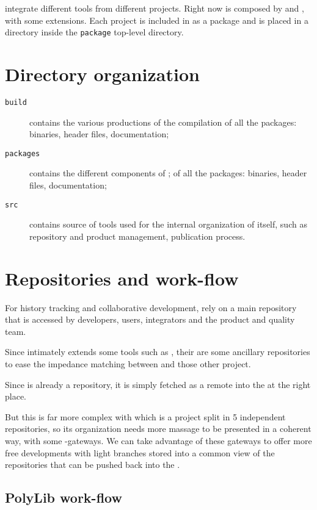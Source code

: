 \documentclass[a4paper]{article}
\begin{document}
\Apfa integrate different tools from different projects. Right now \Apfa
is composed by \Apips and \Apolylib, with some extensions. Each project is
included in \Apfa as a package and is placed in a directory inside the
\texttt{package} top-level directory.


\section{Directory organization}
\label{sec:direct-organ}

\begin{description}
\item[\texttt{build}] contains the various productions of the compilation
  of all the \Apfa packages: binaries, header files, documentation;
\item[\texttt{packages}] contains the different components of \Apfa; of
  all the \Apfa packages: binaries, header files, documentation;
\item[\texttt{src}] contains source of tools used for the internal
  organization of \Apfa itself, such as repository and product management,
  publication process.
\end{description}


\section{Repositories and work-flow}
\label{sec:repos-workfl}

For history tracking and collaborative development, \Apfa rely on a main
\Agit repository that is accessed by \Apfa developers, users, integrators
and the product and quality team.

Since \Apfa intimately extends some tools such as \Apips, their are some
ancillary repositories to ease the impedance matching between \Apfa and
those other project.

Since \Apolylib is already a \Agit repository, it is simply fetched as a
remote \Agit into the \Apfa at the right place.

But this is far more complex with \Apips which is a project split in 5
independent \Asvn repositories, so its organization needs more massage to
be presented in a coherent way, with some \Asvn-\Agit gateways. We can
take advantage of these gateways to offer more free developments with
light branches stored into a common \Agit view of the \Apips{} \Asvn
repositories that can be pushed back into the \Apips{} \Asvn .


\subsection{PolyLib work-flow}
\label{sec:polylib-workflow}
\end{document}
